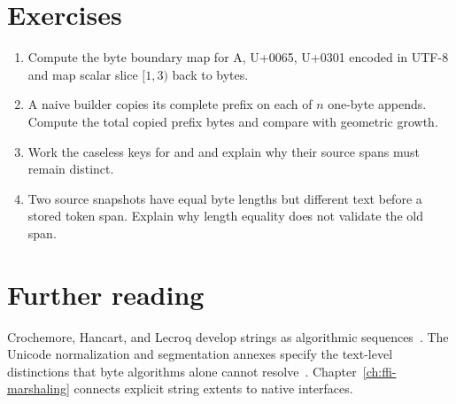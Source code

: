 \section{Exercises}
\label{sec:ch77-exercises}
\begin{enumerate}
\item\label{ex:ch77-offsets} Compute the byte boundary map for A, U+0065, U+0301 encoded in UTF-8 and map scalar slice $[1,3)$ back to bytes.
\item\label{ex:ch77-builder} A naive builder copies its complete prefix on each of $n$ one-byte appends.
Compute the total copied prefix bytes and compare with geometric growth.
\item\label{ex:ch77-key} Work the caseless keys for  and  and explain why their source spans must remain distinct.
\item\label{ex:ch77-snapshot} Two source snapshots have equal byte lengths but different text before a stored token span.
Explain why length equality does not validate the old span.
\end{enumerate}

\section{Further reading}
\label{sec:ch77-reading}
Crochemore, Hancart, and Lecroq develop strings as algorithmic sequences~\cite{crochemore-2007-strings}.
The Unicode normalization and segmentation annexes specify the text-level distinctions that byte algorithms alone cannot resolve~\cite{unicode-2026-normalization,unicode-2026-segmentation}.
Chapter~\ref{ch:ffi-marshaling} connects explicit string extents to native interfaces.
